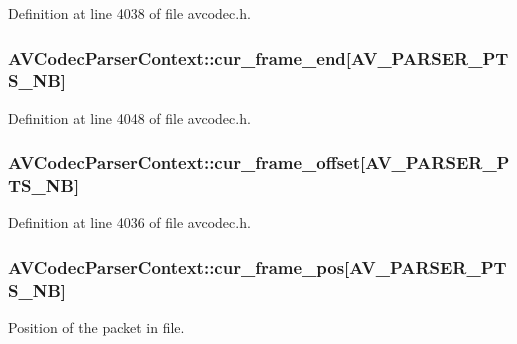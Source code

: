 Definition at line 4038 of file avcodec.\+h.

\subsubsection[{\texorpdfstring{cur\+\_\+frame\+\_\+end}{cur_frame_end}}]{ A\+V\+Codec\+Parser\+Context\+::cur\+\_\+frame\+\_\+end\mbox{[}{\bf A\+V\+\_\+\+P\+A\+R\+S\+E\+R\+\_\+\+P\+T\+S\+\_\+\+NB}\mbox{]}}\hypertarget{struct_a_v_codec_parser_context_a0bcb2d2925118607396a86cddf5d2add}{}\label{struct_a_v_codec_parser_context_a0bcb2d2925118607396a86cddf5d2add}


Definition at line 4048 of file avcodec.\+h.

\subsubsection[{\texorpdfstring{cur\+\_\+frame\+\_\+offset}{cur_frame_offset}}]{ A\+V\+Codec\+Parser\+Context\+::cur\+\_\+frame\+\_\+offset\mbox{[}{\bf A\+V\+\_\+\+P\+A\+R\+S\+E\+R\+\_\+\+P\+T\+S\+\_\+\+NB}\mbox{]}}\hypertarget{struct_a_v_codec_parser_context_abe8a632fc75a7b0a614175552b45f85b}{}\label{struct_a_v_codec_parser_context_abe8a632fc75a7b0a614175552b45f85b}


Definition at line 4036 of file avcodec.\+h.

\subsubsection[{\texorpdfstring{cur\+\_\+frame\+\_\+pos}{cur_frame_pos}}]{ A\+V\+Codec\+Parser\+Context\+::cur\+\_\+frame\+\_\+pos\mbox{[}{\bf A\+V\+\_\+\+P\+A\+R\+S\+E\+R\+\_\+\+P\+T\+S\+\_\+\+NB}\mbox{]}}\hypertarget{struct_a_v_codec_parser_context_a9587a98646942a36bc1f676e6276d331}{}\label{struct_a_v_codec_parser_context_a9587a98646942a36bc1f676e6276d331}
Position of the packet in file.

